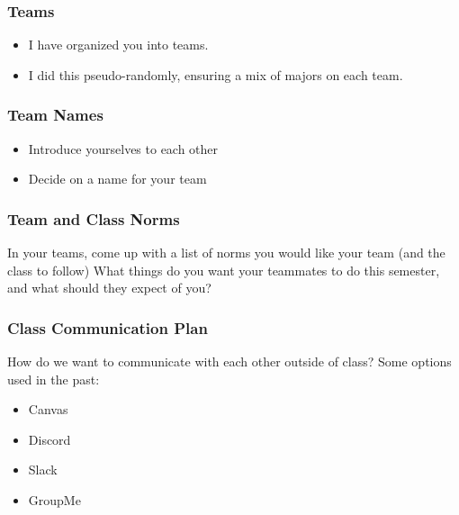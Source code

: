\documentclass[aspectratio=1610]{beamer}
\begin{document}
\begin{frame}\frametitle{Teams}
\begin{itemize}
\item I have organized you into teams.
\item I did this pseudo-randomly, ensuring a mix of majors on each team.
\end{itemize}
\end{frame}



\begin{frame}\frametitle{Team Names}
\begin{itemize}
\item Introduce yourselves to each other
\item Decide on a name for your team
\end{itemize}
\end{frame}

%


\begin{frame}\frametitle{Team and Class Norms}

In your teams, come up with a list of norms you would like your team (and the class to follow)
\vfill
What things do you want your teammates to do this semester, and what should they expect of you?
\end{frame}

\begin{frame}\frametitle{Class Communication Plan}

How do we want to communicate with each other outside of class?
\vfill
Some options used in the past:
\begin{itemize}
\item Canvas 
\item Discord
\item Slack
\item GroupMe
\end{itemize}

\end{frame}
\end{document}
